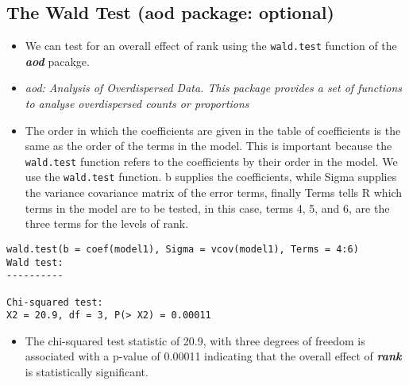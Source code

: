 \documentclass[]{article}
\begin{document}
\subsection{The Wald Test (aod package: optional)}
\begin{itemize}
\item We can test for an overall effect of rank using the \texttt{wald.test} function of the \textbf{\textit{aod}} pacakge. 
\item \textit{aod: Analysis of Overdispersed Data. This package provides a set of functions to analyse overdispersed counts or proportions}
\item The order in which the coefficients are given in the table of coefficients is the same as the order of the terms in the model. This is important because the \texttt{wald.test} function refers to the coefficients by their order in the model. We use the \texttt{wald.test} function. b supplies the coefficients, while Sigma supplies the variance covariance matrix of the error terms, finally Terms tells R which terms in the model are to be tested, in this case, terms 4, 5, and 6, are the three terms for the levels of rank.
\end{itemize}
\begin{framed}
\begin{verbatim}
wald.test(b = coef(model1), Sigma = vcov(model1), Terms = 4:6)
Wald test:
----------

Chi-squared test:
X2 = 20.9, df = 3, P(> X2) = 0.00011
\end{verbatim}
\end{framed}
\begin{itemize}
\item The chi-squared test statistic of 20.9, with three degrees of freedom is associated with a p-value of 0.00011 indicating that the overall effect of \textbf{\textit{rank}} is statistically significant.
\end{itemize}
\end{document}
